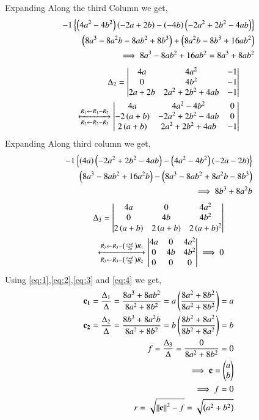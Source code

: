 \documentclass[journal,12pt,twocolumn]{IEEEtran}
\begin{document}
Expanding Along the third Column we get,
\begin{align}
-1\left\{\left(4a^2-4b^2\right)\left(-2a+2b\right) -\left(-4b\right)\left(-2a^2+2b^2-4ab\right)\right\}\\
\left(8a^3-8a^2b - 8ab^2 +8b^3\right)+\left(8a^2b-8b^3+16ab^2\right)\\
\implies 8a^3 -8ab^2+16ab^2 = 8a^3+8ab^2\label{eq:2}
\end{align}
\begin{align}
\Delta_{2} =
    \begin{vmatrix}4a & 4a^2 & -1 \\0 & 4b^2 & -1 \\2a+2b & 2a^2+2b^2+4ab & -1\end{vmatrix}\\
\xleftrightarrow[R_2\leftarrow R_2-R_3]{R_1\leftarrow R_1-R_2}
\begin{vmatrix}4a & 4a^2-4b^2 & 0 \\-2\left(a+b\right) & -2a^2+2b^2-4ab & 0 \\2\left(a+b\right) & 2a^2+2b^2+4ab & -1\end{vmatrix}
\end{align}
Expanding Along third column we get,
\begin{align}
-1\left\{\left(4a\right)\left(-2a^2+2b^2-4ab\right)-\left(4a^2-4b^2\right)\left(-2a-2b\right)\right\}\\
\left(8a^3-8ab^2+16a^2b\right)-\left(8a^3-8ab^2+8a^2b-8b^3\right)\\
\implies 8b^3+8a^2b\label{eq:3}
\end{align}
\begin{align}
\Delta_{3} = 
    \begin{vmatrix}4a & 0 & 4a^2 \\0 & 4b & 4b^2 \\2\left(a+b\right) & 2\left(a+b\right) & 2\left(a+b\right)^2\end{vmatrix}\\
    \xleftrightarrow[R_3\leftarrow R_3-\left(\frac{a+b}{2b}\right)R_2]{R_3\leftarrow R_3-\ensuremath{\left(\frac{a+b}{2a}\right)}R_1}
    \begin{vmatrix}4a & 0 & 4a^2 \\0 & 4b & 4b^2 \\0 & 0 & 0\end{vmatrix} \implies 0 \label{eq:4} 
\end{align}
Using \eqref{eq:1},\eqref{eq:2},\eqref{eq:3} and \eqref{eq:4} we get,
\begin{align}
    \mathbf{c_1}= \frac{\Delta_{1}}{\Delta}= \frac{8a^3+8ab^2}{8a^2+8b^2}= a\left(\frac{8a^2+8b^2}{8a^2+8b^2}\right)= a\\
    \mathbf{c_2}= \frac{\Delta_{2}}{\Delta}= \frac{8b^3+8a^2b}{8a^2+8b^2}= b\left(\frac{8b^2+8a^2}{{8b^2+8a^2}}\right)= b\\
    f= \frac{\Delta_{3}}{\Delta}=\frac{0}{8a^2+8b^2}=0\\
    \implies \mathbf{c} = \begin{pmatrix}a\\b\end{pmatrix}\\
    \implies f = 0\\
    r=\sqrt{\left\lVert\mathbf{c}\right\rVert^2-f} = \sqrt{\left(a^2+b^2\right)}
\end{align}
\end{document}
